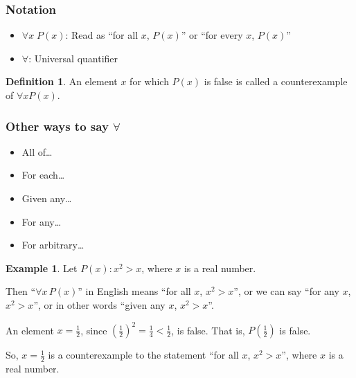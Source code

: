 \documentclass[
]{book}
\providecommand{\tightlist}{%
  \setlength{\itemsep}{0pt}\setlength{\parskip}{0pt}}
\theoremstyle{definition}
\newtheorem{definition}{Definition}[chapter]
\theoremstyle{definition}
\newtheorem{example}{Example}[chapter]
\theoremstyle{definition}
\theoremstyle{definition}
\theoremstyle{remark}
\begin{document}
\subsubsection{Notation}\label{notation}

\begin{itemize}
\tightlist
\item
  \(\forall x\; P(x)\): Read as ``for all \(x\), \(P(x)\)'' or ``for every \(x\), \(P(x)\)''
\item
  \(\forall\): Universal quantifier
\end{itemize}

\begin{definition}
\protect\hypertarget{def:unnamed-chunk-46}{}\label{def:unnamed-chunk-46}An element \(x\) for which \(P(x)\) is false is called a counterexample of \(\forall x P(x)\).
\end{definition}

\subsubsection{\texorpdfstring{Other ways to say \(\forall\)}{Other ways to say \textbackslash forall}}\label{other-ways-to-say-forall}

\begin{itemize}
\tightlist
\item
  All of\ldots{}
\item
  For each\ldots{}
\item
  Given any\ldots{}
\item
  For any\ldots{}
\item
  For arbitrary\ldots{}
\end{itemize}

\begin{example}
\protect\hypertarget{exm:unnamed-chunk-47}{}\label{exm:unnamed-chunk-47}Let \(P(x): x^2 > x\), where \(x\) is a real number.

Then ``\(\forall x\, P(x)\)'' in English means ``for all \(x\), \(x^2 > x\)'', or we can say ``for any \(x\), \(x^2 > x\)'', or in other words ``given any \(x\), \(x^2 > x\)''.

An element \(x = \frac{1}{2}\), since \(\left(\frac{1}{2}\right)^2 = \frac{1}{4} < \frac{1}{2}\), is false. That is, \(P\left(\frac{1}{2}\right)\) is false.

So, \(x = \frac{1}{2}\) is a counterexample to the statement ``for all \(x\), \(x^2 > x\)'', where \(x\) is a real number.
\end{example}
\end{document}
